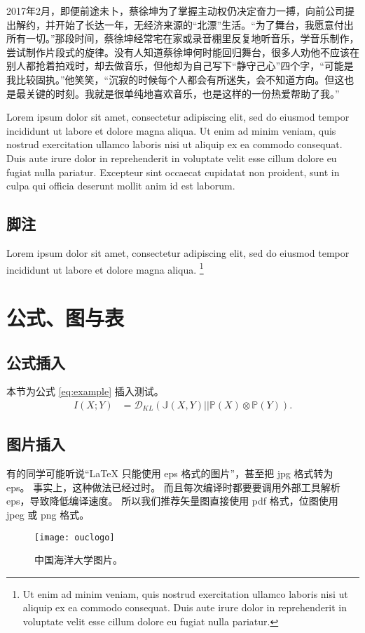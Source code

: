 \documentclass[enmac]{oucthesis}
\begin{document}
2017年2月，即便前途未卜，蔡徐坤为了掌握主动权仍决定奋力一搏，向前公司提出解约，并开始了长达一年，无经济来源的“北漂”生活。“为了舞台，我愿意付出所有一切。”那段时间，蔡徐坤经常宅在家或录音棚里反复地听音乐，学音乐制作，尝试制作片段式的旋律。没有人知道蔡徐坤何时能回归舞台，很多人劝他不应该在别人都抢着拍戏时，却去做音乐，但他却为自己写下“静守己心”四个字，“可能是我比较固执。”他笑笑，“沉寂的时候每个人都会有所迷失，会不知道方向。但这也是最关键的时刻。我就是很单纯地喜欢音乐，也是这样的一份热爱帮助了我。”

Lorem ipsum dolor sit amet, consectetur adipiscing elit, sed do eiusmod tempor
incididunt ut labore et dolore magna aliqua.
Ut enim ad minim veniam, quis nostrud exercitation ullamco laboris nisi ut
aliquip ex ea commodo consequat.
Duis aute irure dolor in reprehenderit in voluptate velit esse cillum dolore eu
fugiat nulla pariatur.
Excepteur sint occaecat cupidatat non proident, sunt in culpa qui officia
deserunt mollit anim id est laborum.

\section{脚注}

Lorem ipsum dolor sit amet, consectetur adipiscing elit, sed do eiusmod tempor
incididunt ut labore et dolore magna aliqua.
\footnote{Ut enim ad minim veniam, quis nostrud exercitation ullamco laboris
  nisi ut aliquip ex ea commodo consequat.
  Duis aute irure dolor in reprehenderit in voluptate velit esse cillum dolore
  eu fugiat nulla pariatur.}




\chapter{公式、图与表}
\section{公式插入}
本节为公式 \ref{eq:example} 插入测试。
\begin{equation}
\begin{split}
I(X;Y)&=\mathcal{D}_{KL}(\mathbb{J}(X,Y)||\mathbb{P}(X)\otimes\mathbb{P}(Y)).
\end{split}
\label{eq:example}
\end{equation}

\section{图片插入}
有的同学可能听说“\LaTeX{} 只能使用 eps 格式的图片”，甚至把 jpg 格式转为 eps。
事实上，这种做法已经过时。
而且每次编译时都要要调用外部工具解析 eps，导致降低编译速度。
所以我们推荐矢量图直接使用 pdf 格式，位图使用 jpeg 或 png 格式。
\begin{figure*}[ht]
    \centering
	\texttt{[image: ouclogo]}
	\caption{中国海洋大学图片。}
	\label{fig:ouc}
\end{figure*}
\end{document}
